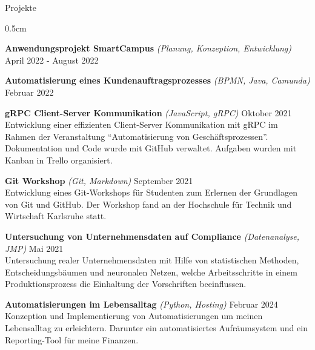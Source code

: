 \documentclass{resume} %
\begin{document}
\begin{rSection}{Projekte}
\begin{adjustwidth}{0.5cm}{}
        \item \textbf{Anwendungsprojekt SmartCampus} \textit{(Planung, Konzeption, Entwicklung)} \hfill {April 2022 - August 2022} \\
        
        \item \textbf{Automatisierung eines Kundenauftragsprozesses} \textit{(BPMN, Java, Camunda)} \hfill {Februar 2022} \\
    
        \item \textbf{gRPC Client-Server Kommunikation} \textit{(JavaScript, gRPC)} \hfill {Oktober 2021} \\
        {Entwicklung einer effizienten Client-Server Kommunikation mit gRPC im Rahmen der Veranstaltung “Automatisierung von Geschäftsprozessen”.
        Dokumentation und Code wurde mit GitHub verwaltet. Aufgaben wurden mit Kanban in Trello organisiert.}
        
        \item \textbf{Git Workshop} \textit{(Git, Markdown)} \hfill {September 2021} \\
        {Entwicklung eines Git-Workshops für Studenten zum Erlernen der Grundlagen von Git und GitHub.
        Der Workshop fand an der Hochschule für Technik und Wirtschaft Karlsruhe statt.}
    
        \item \textbf{Untersuchung von Unternehmensdaten auf Compliance} \textit{(Datenanalyse, JMP)} \hfill {Mai 2021} \\
        {Untersuchung realer Unternehmensdaten mit Hilfe von statistischen Methoden, Entscheidungsbäumen und neuronalen Netzen,
        welche Arbeitsschritte in einem Produktionsprozess die Einhaltung der Vorschriften beeinflussen.}
    
        \item \textbf{Automatisierungen im Lebensalltag} \textit{(Python, Hosting)}  \hfill {Februar 2024} \\
        {Konzeption und Implementierung von Automatisierungen um meinen Lebensalltag zu erleichtern. Darunter ein automatisiertes Aufräumsystem und ein Reporting-Tool für meine Finanzen.} 
        

\end{adjustwidth}
\end{rSection}
\end{document}
